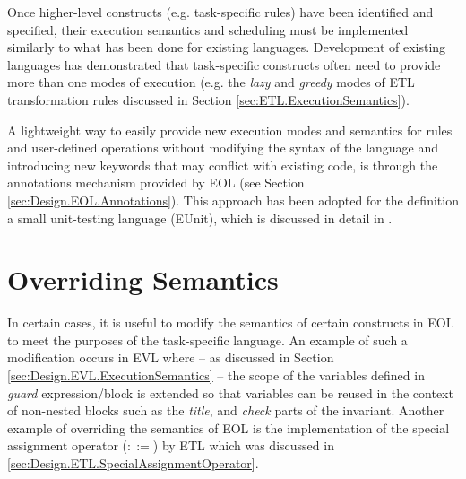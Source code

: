 Once higher-level constructs (e.g. task-specific rules) have been identified and specified, their execution semantics and scheduling must be implemented similarly to what has been done for existing languages. Development of existing languages has demonstrated that task-specific constructs often need to provide more than one modes of execution (e.g. the \emph{lazy} and \emph{greedy} modes of ETL transformation rules discussed in Section \ref{sec:ETL.ExecutionSemantics}). 

A lightweight way to easily provide new execution modes and semantics for rules and user-defined operations without modifying the syntax of the language and introducing new keywords that may conflict with existing code, is through the annotations mechanism provided by EOL (see Section \ref{sec:Design.EOL.Annotations}). This approach has been adopted for the definition a small unit-testing language (EUnit), which is discussed in detail in \cite{EUnit}.

\section{Overriding Semantics}

In certain cases, it is useful to modify the semantics of certain constructs in EOL to meet the purposes of the task-specific language. An example of such a modification occurs in EVL where -- as discussed in Section \ref{sec:Design.EVL.ExecutionSemantics} -- the scope of the variables defined in \emph{guard} expression/block is extended so that variables can be reused in the context of non-nested blocks such as the \emph{title}, and \emph{check} parts of the invariant. Another example of overriding the semantics of EOL is the implementation of the special assignment operator ($::=$) by ETL which was discussed in \ref{sec:Design.ETL.SpecialAssignmentOperator}.





